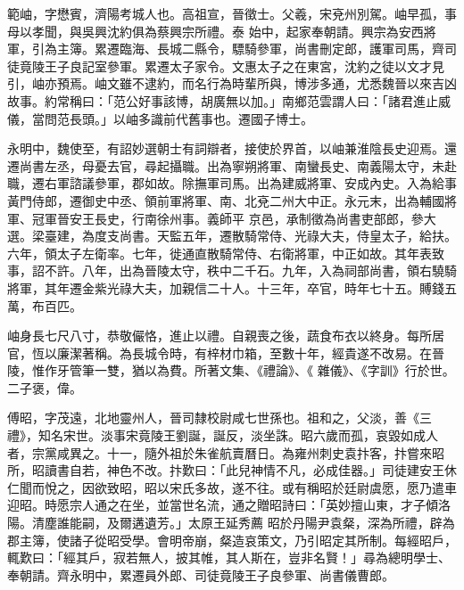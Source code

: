 
\begin{pinyinscope}

 範岫，字懋賓，濟陽考城人也。高祖宣，晉徵士。父羲，宋兗州別駕。岫早孤，事母以孝聞，與吳興沈約俱為蔡興宗所禮。泰
 始中，起家奉朝請。興宗為安西將軍，引為主簿。累遷臨海、長城二縣令，驃騎參軍，尚書刪定郎，護軍司馬，齊司徒竟陵王子良記室參軍。累遷太子家令。文惠太子之在東宮，沈約之徒以文才見引，岫亦預焉。岫文雖不逮約，而名行為時輩所與，博涉多通，尤悉魏晉以來吉凶故事。約常稱曰：「范公好事該博，胡廣無以加。」南鄉范雲謂人曰：「諸君進止威儀，當問范長頭。」以岫多識前代舊事也。遷國子博士。



 永明中，魏使至，有詔妙選朝士有詞辯者，接使於界首，以岫兼淮陰長史迎焉。還遷尚書左丞，母憂去官，尋起攝職。出為寧朔將軍、南蠻長史、南義陽太守，未赴職，遷右軍諮議參軍，郡如故。除撫軍司馬。出為建威將軍、安成內史。入為給事黃門侍郎，遷御史中丞、領前軍將軍、南、北兗二州大中正。永元末，出為輔國將軍、冠軍晉安王長史，行南徐州事。義師平
 京邑，承制徵為尚書吏部郎，參大選。梁臺建，為度支尚書。天監五年，遷散騎常侍、光祿大夫，侍皇太子，給扶。六年，領太子左衛率。七年，徙通直散騎常侍、右衛將軍，中正如故。其年表致事，詔不許。八年，出為晉陵太守，秩中二千石。九年，入為祠部尚書，領右驍騎將軍，其年遷金紫光祿大夫，加親信二十人。十三年，卒官，時年七十五。賻錢五萬，布百匹。



 岫身長七尺八寸，恭敬儼恪，進止以禮。自親喪之後，蔬食布衣以終身。每所居官，恆以廉潔著稱。為長城令時，有梓材巾箱，至數十年，經貴遂不改易。在晉陵，惟作牙管筆一雙，猶以為費。所著文集、《禮論》、《
 雜儀》、《字訓》行於世。二子褒，偉。



 傅昭，字茂遠，北地靈州人，晉司隸校尉咸七世孫也。祖和之，父淡，善《三禮》，知名宋世。淡事宋竟陵王劉誕，誕反，淡坐誅。昭六歲而孤，哀毀如成人者，宗黨咸異之。十一，隨外祖於朱雀航賣曆日。為雍州刺史袁抃客，抃嘗來昭所，昭讀書自若，神色不改。抃歎曰：「此兒神情不凡，必成佳器。」司徒建安王休仁聞而悅之，因欲致昭，昭以宋氏多故，遂不往。或有稱昭於廷尉虞愿，愿乃遣車迎昭。時愿宗人通之在坐，並當世名流，通之贈昭詩曰：「英妙擅山東，才子傾洛陽。清塵誰能嗣，及爾遘遺芳。」太原王延秀薦
 昭於丹陽尹袁粲，深為所禮，辟為郡主簿，使諸子從昭受學。會明帝崩，粲造哀策文，乃引昭定其所制。每經昭戶，輒歎曰：「經其戶，寂若無人，披其帷，其人斯在，豈非名賢！」尋為總明學士、奉朝請。齊永明中，累遷員外郎、司徒竟陵王子良參軍、尚書儀曹郎。




\end{pinyinscope}
